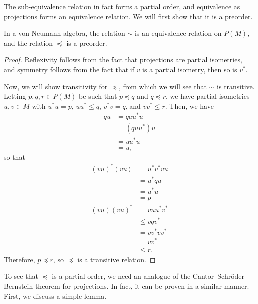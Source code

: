 \documentclass[10pt]{mypackage}
\begin{document}
The sub-equivalence relation in fact forms a partial order, and equivalence as projections forms an equivalence relation. We will first show that it is a preorder.
\begin{proposition}
  In a von Neumann algebra, the relation $\sim$ is an equivalence relation on $P(M)$, and the relation $\preceq$ is a preorder.
\end{proposition}
\begin{proof}
  Reflexivity follows from the fact that projections are partial isometries, and symmetry follows from the fact that if $v$ is a partial isometry, then so is $v^{\ast}$.

  Now, we will show transitivity for $\preceq$, from which we will see that $\sim$ is transitive. Letting $p,q,r\in P(M)$ be such that $p\preceq q$ and $q\preceq r$, we have partial isometries $u,v\in M$ with $u^{\ast}u = p$, $uu^{\ast}\leq q$, $v^{\ast}v = q$, and $vv^{\ast}\leq r$. Then, we have
  \begin{align*}
    qu &= q uu^{\ast}u\\
       &= \left( quu^{\ast} \right)u\\
       &= uu^{\ast}u\\
       &= u,
  \end{align*}
  so that
  \begin{align*}
    \left( vu \right)^{\ast}\left( vu \right) &= u^{\ast}v^{\ast}vu\\
                                              &= u^{\ast}qu\\
                                              &= u^{\ast}u\\
                                              &= p\\
    \left( vu \right)\left( vu \right)^{\ast} &= vuu^{\ast}v^{\ast}\\
                                              &\leq vqv^{\ast}\\
                                              &= vv^{\ast}vv^{\ast}\\
                                              &= vv^{\ast}\\
                                              &\leq r.
  \end{align*}
  Therefore, $p\preceq r$, so $\preceq$ is a transitive relation.
\end{proof}
To see that $\preceq$ is a partial order, we need an analogue of the Cantor--Schröder--Bernstein theorem for projections. In fact, it can be proven in a similar manner. First, we discuss a simple lemma.
\end{document}

